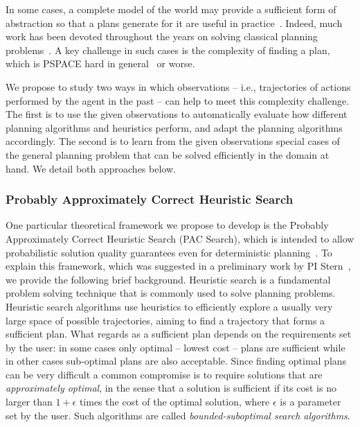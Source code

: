 \documentclass[12pt]{article}
\begin{document}
In some cases, a complete model of the world may provide a sufficient form of abstraction so that a plans generate for it are useful in practice~\cite{ruml2011line}. Indeed, much work has been devoted throughout the years on solving classical planning problems~\cite{ghallab2004automated,borgo2016planning}. A key challenge in such cases is the complexity of finding a plan, which is PSPACE hard in general~\cite{bylander1994computational} or worse. %



We propose to study two ways in which observations -- i.e., trajectories of actions performed by the agent in the past -- can help to meet this complexity challenge. The first is to use the given observations to automatically evaluate how different planning algorithms and heuristics perform, and adapt the planning algorithms accordingly. The second is to learn from the given observations special cases of the general planning problem that can be solved efficiently in the domain at hand. We detail both  approaches below. 





\subsubsection{Probably Approximately Correct Heuristic Search} 
One particular theoretical framework we propose to develop is the Probably Approximately Correct Heuristic Search (PAC Search), which is intended to allow probabilistic solution quality guarantees even for deterministic planning~\cite{stern2011probably,stern2012search}. 
To explain this framework, which was suggested in a preliminary work by PI Stern~\cite{stern2011probably,stern2012search}, we provide the following brief background. 
Heuristic search is a fundamental problem solving technique that is commonly used to solve planning problems. Heuristic search algorithms use heuristics to efficiently explore a usually very large space of possible trajectories, aiming to find a trajectory that forms a sufficient plan. What regards as a sufficient plan depends on the requirements set by the user: in some cases only optimal -- lowest cost -- plans are sufficient while in other cases sub-optimal plans are also acceptable. Since finding optimal plans can be very difficult a common compromise is to require solutions that are {\em approximately optimal}, in the sense that a solution is sufficient if its cost is no larger than $1+\epsilon$ times the cost of the optimal solution, where $\epsilon$ is a parameter set by the user. Such algorithms are called {\em bounded-suboptimal search algorithms}. 
\end{document}
